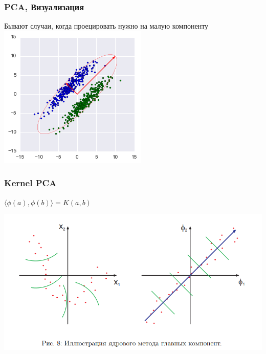 \documentclass[14pt]{beamer}
\begin{document}
\begin{frame}
\frametitle{PCA, Визуализация}
	Бывают случаи, когда проецировать нужно на малую компоненту\\
	\includegraphics[width=0.5\linewidth]{pcastrange.png}
\end{frame}

\begin{frame}
\frametitle{Kernel PCA}
	\vspace{-4pt}
	\begin{center}
	$\langle \phi(a),\phi(b) \rangle = K(a,b)$
	\end{center}
	\includegraphics[width=\linewidth]{kerpca.png}
\end{frame}
\end{document}
